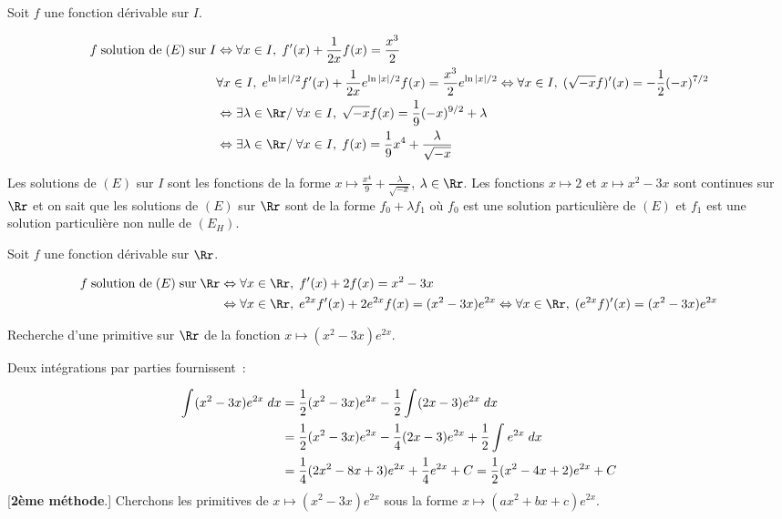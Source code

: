 {{Soit $f$ une fonction dérivable sur $I$.

\begin{align*}\ensuremath
f\;\mbox{solution de}\;(E)\;\mbox{sur}\;I&\Leftrightarrow\forall x\in I,\;f'(x)+\frac{1}{2x}f(x)=\frac{x^3}{2}\\
 &\forall x\in I,\;e^{\ln|x|/2}f'(x)+\frac{1}{2x}e^{\ln|x|/2}f(x)=\frac{x^3}{2}e^{\ln|x|/2}\Leftrightarrow\forall x\in
I,\;(\sqrt{-x}f)'(x)=-\frac{1}{2}(-x)^{7/2}\\
 &\Leftrightarrow\exists\lambda\in\Rr/\;\forall x\in I,\;\sqrt{-x}f(x)=\frac{1}{9}(-x)^{9/2}+\lambda\\
 &\Leftrightarrow\exists\lambda\in\Rr/\;\forall x\in I,\;f(x)=\frac{1}{9}x^4+\frac{\lambda}{\sqrt{-x}}
\end{align*}

Les solutions de $(E)$ sur  $I$ sont les fonctions de la forme $x\mapsto\frac{x^4}{9}+\frac{\lambda}{\sqrt{-x}}$,
$\lambda\in\Rr$.
Les fonctions $x\mapsto2$ et $x\mapsto x^2-3x$ sont continues sur $\Rr$ et on sait
que les solutions de $(E)$ sur $\Rr$ sont de la forme
$f_0+\lambda f_1$ où $f_0$ est une solution particulière de $(E)$ et $f_1$ est une solution particulière non nulle de
$(E_H)$.

Soit $f$ une fonction dérivable sur $\Rr$.

\begin{align*}\ensuremath
f\;\mbox{solution de}\;(E)\;\mbox{sur}\;\Rr&\Leftrightarrow\forall x\in\Rr,\;f'(x)+2f(x)=x^2-3x\\
 &\Leftrightarrow\forall x\in\Rr,\;e^{2x}f'(x)+2e^{2x}f(x)=(x^2-3x)e^{2x}\Leftrightarrow\forall
x\in\Rr,\;(e^{2x}f)'(x)=(x^2-3x)e^{2x}
\end{align*}

Recherche d'une primitive sur ${\Rr}$ de la fonction $x\mapsto(x^2-3x)e^{2x}$.
\begin{itemize}
 Deux intégrations par parties fournissent~:

\begin{align*}\ensuremath
\int_{}^{}(x^2-3x)e^{2x}\;dx&=\frac{1}{2}(x^2-3x)e^{2x}-\frac{1}{2}\int_{}^{}(2x-3)e^{2x}\;dx\\
 &=\frac{1}{2}(x^2-3x)e^{2x}-\frac{1}{4}(2x-3)e^{2x}+\frac{1}{2}\int_{}^{}e^{2x}\;dx\\
 &=\frac{1}{4}(2x^2-8x+3)e^{2x}+\frac{1}{4}e^{2x}+C=\frac{1}{2}(x^2-4x+2)e^{2x}+C
\end{align*}
[\textbf{2ème méthode}.] Cherchons les primitives de $x\mapsto(x^2-3x)e^{2x}$ sous la forme
$x\mapsto(ax^2+bx+c)e^{2x}$.


\end{itemize}}}

